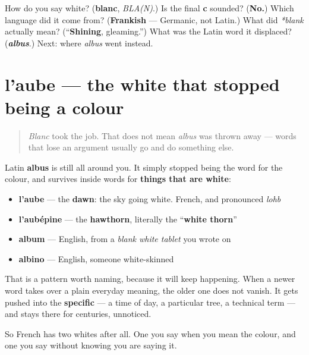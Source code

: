 \begin{tcolorbox}[breakable,colback=teal!4,colframe=teal!35!black,title={Before you move on}]
How do you say white? (\textbf{blanc}, \emph{BLA(N)}.) Is the final \textbf{c} sounded? (\textbf{No.}) Which language did it come from? (\textbf{Frankish} — Germanic, not Latin.) What did \emph{*blank} actually mean? (\textquotedblleft{}\textbf{Shining}, gleaming.\textquotedblright{}) What was the Latin word it displaced? (\emph{\textbf{albus}}.) Next: where \emph{albus} went instead.
\end{tcolorbox}
\section[l'aube]{l'aube — the white that stopped being a colour}

\label{lesson:FR-C13-aube}



\begin{quote}
\emph{Blanc} took the job. That does not mean \emph{albus} was thrown away — words that lose an argument usually go and do something else.
\end{quote}

\begin{cousinweb}
Latin \textbf{albus} is still all around you. It simply stopped being the word for the colour, and survives inside words for \textbf{things that are white}:

\begin{itemize}
\raggedright
  \item \textbf{l'aube} — the \textbf{dawn}: the sky going white. French, and pronounced \emph{lohb}
  \item \textbf{l'aubépine} — the \textbf{hawthorn}, literally the \textquotedblleft{}\textbf{white thorn}\textquotedblright{}
  \item \textbf{album} — English, from a \emph{blank white tablet} you wrote on
  \item \textbf{albino} — English, someone white-skinned
\end{itemize}

That is a pattern worth naming, because it will keep happening. When a newer word takes over a plain everyday meaning, the older one does not vanish. It gets pushed into the \textbf{specific} — a time of day, a particular tree, a technical term — and stays there for centuries, unnoticed.

So French has two whites after all. One you say when you mean the colour, and one you say without knowing you are saying it.
\end{cousinweb}

